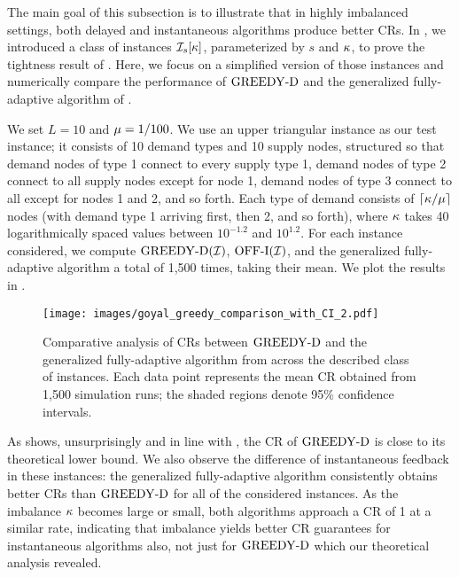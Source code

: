 {\label{ssec:imbalanced}

The main goal of this subsection is to illustrate that in highly imbalanced settings, both delayed and instantaneous algorithms produce better CRs. 
In , we introduced a class of instances $\mathcal I_s[\kappa]$, parameterized by $s$ and $\kappa$, to prove the tightness result of . Here, we focus on a simplified version of those instances and numerically compare the performance of $\mathrm{GREEDY\textrm{-}D}$ and the generalized fully-adaptive algorithm of \citet{goyal2023online}.

We set $L = 10$ and $\mu = 1/100$. We use an upper triangular instance as our test instance; it consists of 10 demand types and 10 supply nodes, structured so that demand nodes of type 1 connect to every supply type 1, demand nodes of type 2 connect to all supply nodes except for node 1, demand nodes of type 3 connect to all except for nodes 1 and 2, and so forth. Each type of demand consists of $\lceil \kappa / \mu \rceil$ nodes (with demand type 1 arriving first, then 2, and so forth), where $\kappa$ takes 40 logarithmically spaced values between $10^{-1.2}$ and $10^{1.2}$. For each instance considered, we compute $\mathrm{GREEDY\textrm{-}D}(\mathcal I)$, $\mathrm{\mathrm{OFF}}\textrm{-}\mathrm{I}(\mathcal I)$, and the generalized fully-adaptive algorithm a total of {1,500} times, taking their mean. We plot the results in .
\begin{figure}[h]
    \centering
    \texttt{[image: images/goyal\_greedy\_comparison\_with\_CI\_2.pdf]}
    \caption{Comparative analysis of CRs between $\mathrm{GREEDY\textrm{-}D}$  and the generalized fully-adaptive algorithm from \citet{goyal2023online} across the described class of instances. Each data point represents the mean CR obtained from 1,500 simulation runs; the shaded regions denote {95\% confidence intervals}. }
    \label{fig: goyal_greedy_comparison}
\end{figure}


As  shows, unsurprisingly and in line with , the CR of $\mathrm{GREEDY\textrm{-}D}$ is close to its theoretical lower bound. We also observe the difference of instantaneous feedback in these instances: the generalized fully-adaptive algorithm consistently obtains better CRs than $\mathrm{GREEDY\textrm{-}D}$ for all of the considered instances. As the imbalance $\kappa$ becomes large or small, both algorithms approach a CR of 1 at a similar rate, indicating that imbalance yields better CR guarantees for instantaneous algorithms also, not just for $\mathrm{GREEDY\textrm{-}D}$ which our theoretical analysis revealed. 

}
